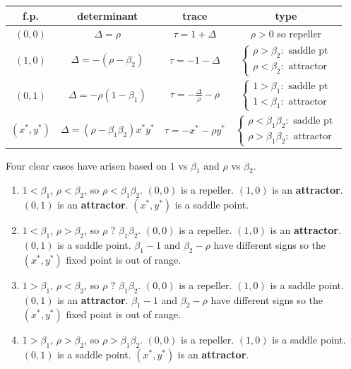 \documentclass[12pt,letterpaper]{exam}
\begin{document}
\begin{questions}
\begin{parts}
\begin{solution}
\begin{tabular}{c | c| c| c}
f.p. &  determinant & trace & type\\
\hline
$(0,0)$ &   $\Delta = \rho$ & $\tau = 1 + \Delta$  & $\rho > 0$ so repeller\\
\hline
 $(1,0)$ & $\Delta = -(\rho - \beta_2)$ & $\tau = -1 -\Delta$ & $\left\{\begin{array}{c} \rho > \beta_2: \text{ saddle pt} \\ \rho < \beta_2: \text{ attractor}\end{array}\right.$ \\
 \hline
 $(0,1)$ & $\Delta = -\rho(1-\beta_1)$ & $\tau = -\frac{\Delta}{\rho} - \rho$ & $\left\{\begin{array}{c} 1 > \beta_1: \text{ saddle pt} \\ 1 < \beta_1: \text{ attractor}\end{array}\right.$ \\
\hline
 $(x^*,y^*)$ &  $\Delta = (\rho -\beta_1\beta_2) x^*y^*$&  $\tau = -x^* - \rho y^*$ & $\left\{\begin{array}{c} \rho < \beta_1\beta_2: \text{ saddle pt} \\ \rho > \beta_1\beta_2: \text{ attractor}\end{array}\right.$
\end{tabular}

Four clear cases have arisen based on $1$ vs $\beta_1$ and $\rho$ vs $\beta_2$.

\begin{enumerate}
\item $1<\beta_1$, $\rho < \beta_2$, so $\rho < \beta_1\beta_2$.  $(0,0)$ is a repeller.  $(1,0)$ is an \textbf{attractor}.  $(0,1)$ is an \textbf{attractor}.  $(x^*,y^*)$ is a saddle point.
\item $1<\beta_1$, $\rho > \beta_2$, so $\rho\text{ ? }\beta_1\beta_2$.  $(0,0)$ is a repeller.  $(1,0)$ is an \textbf{attractor}.  $(0,1)$ is a saddle point.  $\beta_1 -1$ and $\beta_2 - \rho$ have different signs so the $(x^*,y^*)$ fixed point is out of range.
\item $1>\beta_1$, $\rho < \beta_2$, so $\rho\text{ ? }\beta_1\beta_2$.  $(0,0)$ is a repeller.  $(1,0)$ is a saddle point.  $(0,1)$ is an \textbf{attractor}.  $\beta_1 -1$ and $\beta_2 - \rho$ have different signs so the $(x^*,y^*)$ fixed point is out of range.
\item $1>\beta_1$, $\rho > \beta_2$, so $\rho > \beta_1\beta_2$.  $(0,0)$ is a repeller.  $(1,0)$ is a saddle point.  $(0,1)$ is a saddle point.  $(x^*,y^*)$ is an \textbf{attractor}.
\end{enumerate}


\end{solution}
\end{parts}
\end{questions}
\end{document}
